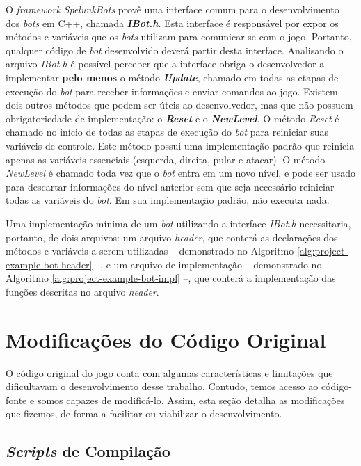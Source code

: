 O \textit{framework} \textit{SpelunkBots} provê uma interface comum para o
desenvolvimento dos \textit{bots} em C++, chamada \textbf{\textit{IBot.h}}. Esta
interface é responsável por expor os métodos e variáveis que os \textit{bots}
utilizam para comunicar-se com o jogo. Portanto, qualquer código de \textit{bot}
desenvolvido deverá partir desta interface. Analisando o arquivo \textit{IBot.h}
é possível perceber que a interface obriga o desenvolvedor a implementar
\textbf{pelo menos} o método \textbf{\textit{Update}}, chamado em todas as
etapas de execução do \textit{bot} para receber informações e enviar comandos ao
jogo. Existem dois outros métodos que podem ser úteis ao desenvolvedor, mas que
não possuem obrigatoriedade de implementação: o \textbf{\textit{Reset}} e o
\textbf{\textit{NewLevel}}. O método \textit{Reset} é chamado no início de todas
as etapas de execução do \textit{bot} para reiniciar suas variáveis de controle.
Este método possui uma implementação padrão que reinicia apenas as variáveis
essenciais (esquerda, direita, pular e atacar). O método \textit{NewLevel} é
chamado toda vez que o \textit{bot} entra em um novo nível, e pode ser usado
para descartar informações do nível anterior sem que seja necessário reiniciar
todas as variáveis do \textit{bot}. Em sua implementação padrão, não executa
nada.

Uma implementação mínima de um \textit{bot} utilizando a interface
\textit{IBot.h} necessitaria, portanto, de dois arquivos: um arquivo
\textit{header}, que conterá as declarações dos métodos e variáveis a serem
utilizadas -- demonstrado no Algoritmo \ref{alg:project-example-bot-header} --,
e um arquivo de implementação -- demonstrado no Algoritmo
\ref{alg:project-example-bot-impl} --, que conterá a implementação das funções
descritas no arquivo \textit{header}.

\section{\label{section:modifications}Modificações do Código Original}

O código original do jogo conta com algumas características e limitações que
dificultavam o desenvolvimento desse trabalho. Contudo, temos acesso ao
código-fonte e somos capazes de modificá-lo. Assim, esta seção detalha as
modificações que fizemos, de forma a facilitar ou viabilizar o desenvolvimento.

\subsection{\textit{Scripts} de Compilação}

